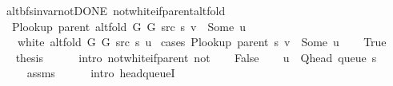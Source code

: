 \begin{isabellebody}
%
\endisatagdocument
{\isafolddocument}%
%
\isadelimdocument
%
\endisadelimdocument
{}\isamarkupfalse%
\ {\isacharparenleft}{\kern0pt}\ alt{\isacharunderscore}{\kern0pt}bfs{\isacharunderscore}{\kern0pt}invar{\isacharunderscore}{\kern0pt}not{\isacharunderscore}{\kern0pt}DONE{\isacharparenright}{\kern0pt}\ not{\isacharunderscore}{\kern0pt}white{\isacharunderscore}{\kern0pt}if{\isacharunderscore}{\kern0pt}parent{\isacharunderscore}{\kern0pt}alt{\isacharunderscore}{\kern0pt}fold{\isacharcolon}{\kern0pt}\isanewline
\ \ \ {\isachardoublequoteopen}P{\isacharunderscore}{\kern0pt}lookup\ {\isacharparenleft}{\kern0pt}parent\ {\isacharparenleft}{\kern0pt}alt{\isacharunderscore}{\kern0pt}fold\ G{}\ G{}\ src\ s{\isacharparenright}{\kern0pt}{\isacharparenright}{\kern0pt}\ v\ {\isacharequal}{\kern0pt}\ Some\ u{\isachardoublequoteclose}\isanewline
\ \ \ {\isachardoublequoteopen}{\isasymnot}\ white\ {\isacharparenleft}{\kern0pt}alt{\isacharunderscore}{\kern0pt}fold\ G{}\ G{}\ src\ s{\isacharparenright}{\kern0pt}\ u{\isachardoublequoteclose}\isanewline
%
\isadelimproof
%
\endisadelimproof
%
\isatagproof
{}\isamarkupfalse%
\ {\isacharparenleft}{\kern0pt}cases\ {\isachardoublequoteopen}P{\isacharunderscore}{\kern0pt}lookup\ {\isacharparenleft}{\kern0pt}parent\ s{\isacharparenright}{\kern0pt}\ v\ {\isacharequal}{\kern0pt}\ Some\ u{\isachardoublequoteclose}{\isacharparenright}{\kern0pt}\isanewline
\ \ \isamarkupfalse%
\ True\isanewline
\ \ \isamarkupfalse%
\ {\isacharquery}{\kern0pt}thesis\isanewline
\ \ \ \ \isamarkupfalse%
\ {\isacharparenleft}{\kern0pt}intro\ not{\isacharunderscore}{\kern0pt}white{\isacharunderscore}{\kern0pt}if{\isacharunderscore}{\kern0pt}parent\ not{\isacharunderscore}{\kern0pt}{\isacharparenleft}{\kern0pt}{}{\isacharparenright}{\kern0pt}{\isacharparenright}{\kern0pt}\isanewline
{}\isamarkupfalse%
\isanewline
\ \ \isamarkupfalse%
\ False\isanewline
\ \ \isamarkupfalse%
\ {\isachardoublequoteopen}u\ {\isacharequal}{\kern0pt}\ Q{\isacharunderscore}{\kern0pt}head\ {\isacharparenleft}{\kern0pt}queue\ s{\isacharparenright}{\kern0pt}{\isachardoublequoteclose}\isanewline
\ \ \ \ \isamarkupfalse%
\ assms\isanewline
\ \ \ \ \isamarkupfalse%
\ {\isacharparenleft}{\kern0pt}intro\ head{\isacharunderscore}{\kern0pt}queueI{\isacharunderscore}{\kern0pt}{}{\isacharparenright}{\kern0pt}\isanewline

\end{isabellebody}
